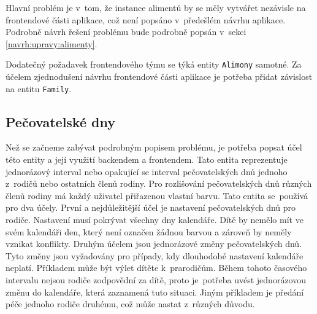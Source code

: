         Hlavní problém je v~tom, že instance alimentů by se měly vytvářet nezávisle na frontendové části aplikace, což není popsáno v~předešlém návrhu aplikace. Podrobně návrh řešení problému bude podrobně popsán v~sekci \ref{navrh:upravy:alimenty}.
        
        Dodatečný požadavek frontendového týmu se týká entity \texttt{Alimony} samotné. Za účelem zjednodušení návrhu frontendové části aplikace je potřeba přidat závislost na entitu \texttt{Family}. %
        
    \subsection{Pečovatelské dny}\label{analyza:pozadavky:caredays}
        Než se začneme zabývat podrobným popisem problému, je potřeba popsat účel této entity a její využití backendem a frontendem. Tato entita reprezentuje jednorázový interval nebo opakující se interval pečovatelských dnů jednoho z~rodičů nebo ostatních členů rodiny. Pro rozlišování pečovatelských dnů různých členů rodiny má každý uživatel přiřazenou vlastní barvu. Tato entita se~používá pro dva účely. První a nejdůležitější účel je nastavení pečovatelských dnů pro rodiče. Nastavení musí pokrývat všechny dny kalendáře. Dítě by nemělo mít ve svém kalendáři den, který není označen žádnou barvou a zároveň by neměly vznikat konflikty. Druhým účelem jsou jednorázové změny pečovatelských dnů. Tyto změny jsou vyžadovány pro případy, kdy dlouhodobé nastavení kalendáře neplatí. Příkladem může být výlet dítěte k~prarodičům. Během tohoto časového intervalu nejsou rodiče zodpovědní za dítě, proto je~potřeba uvést jednorázovou změnu do kalendáře, která zaznamená tuto situaci. Jiným příkladem je předání péče jednoho rodiče druhému, což může nastat z~různých důvodu.

